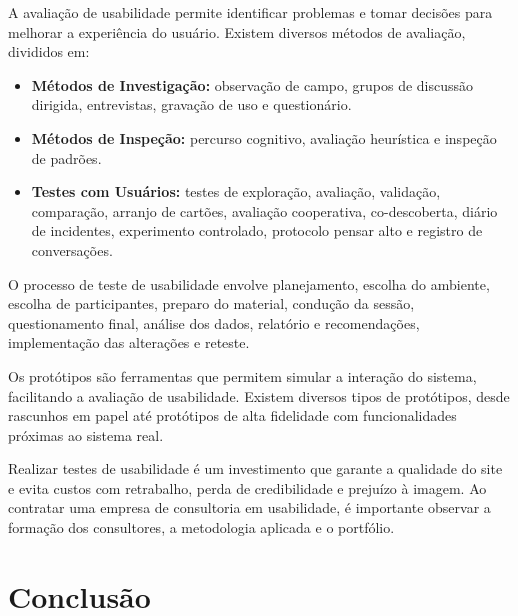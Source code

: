 \documentclass[
  12pt,
  openright,
  twoside,
  a4paper,
  english,
  french,
  spanish,
  brazil
]{abntex2}
\begin{document}
A avaliação de usabilidade permite identificar problemas e tomar decisões para
melhorar a experiência do usuário. Existem diversos métodos de avaliação,
divididos em:

\begin{itemize}
  \item
    \textbf{Métodos de Investigação:} observação de campo, grupos de discussão
    dirigida, entrevistas, gravação de uso e questionário.
  \item
    \textbf{Métodos de Inspeção:} percurso cognitivo, avaliação heurística e
    inspeção de padrões.
  \item
    \textbf{Testes com Usuários:} testes de exploração, avaliação, validação,
    comparação, arranjo de cartões, avaliação cooperativa, co-descoberta, diário
    de incidentes, experimento controlado, protocolo pensar alto e registro de
    conversações.
\end{itemize}

O processo de teste de usabilidade envolve planejamento, escolha do ambiente,
escolha de participantes, preparo do material, condução da sessão,
questionamento final, análise dos dados, relatório e recomendações,
implementação das alterações e reteste.

Os protótipos são ferramentas que permitem simular a interação do sistema,
facilitando a avaliação de usabilidade. Existem diversos tipos de protótipos,
desde rascunhos em papel até protótipos de alta fidelidade com funcionalidades
próximas ao sistema real.

Realizar testes de usabilidade é um investimento que garante a qualidade do site
e evita custos com retrabalho, perda de credibilidade e prejuízo à imagem. Ao
contratar uma empresa de consultoria em usabilidade, é importante observar a
formação dos consultores, a metodologia aplicada e o portfólio.


\chapter{Conclusão}

\postextual



\printindex
\end{document}
